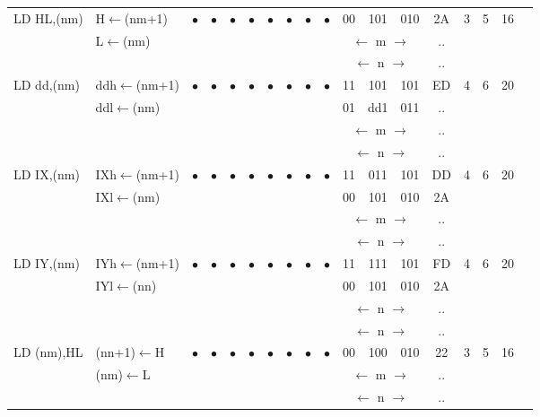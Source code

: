 \documentclass[oneside,a4paper]{book}
\begin{document}
{\begin{tabular}{llcccccccccccccccl}
		LD HL,(nm) & H$\leftarrow$(nm+1) &
			$\bullet$ & $\bullet$ & $\bullet$ & $\bullet$ & $\bullet$ & $\bullet$ & $\bullet$ & $\bullet$ & 
			00 & 101 & 010 & 
			2A & 3 & 
			5 & 16 & \\ 
		& L$\leftarrow$(nm) & \multicolumn{8}{c}{} & \multicolumn{3}{c}{$\longleftarrow$ m $\longrightarrow$} & .. & & & \\
		\multicolumn{10}{c}{} & \multicolumn{3}{c}{$\longleftarrow$ n $\longrightarrow$} & .. & & & \\[4pt]

		LD dd,(nm) & ddh$\leftarrow$(nm+1) &
			$\bullet$ & $\bullet$ & $\bullet$ & $\bullet$ & $\bullet$ & $\bullet$ & $\bullet$ & $\bullet$ & 
			11 & 101 & 101 & 
			ED & 4 & 
			6 & 20 & \\ 
		& ddl$\leftarrow$(nm) & \multicolumn{8}{c}{} & 01 & dd1 & 011 & .. & & & \\
		\multicolumn{10}{c}{} & \multicolumn{3}{c}{$\longleftarrow$ m $\longrightarrow$} & .. & & & \\
		\multicolumn{10}{c}{} & \multicolumn{3}{c}{$\longleftarrow$ n $\longrightarrow$} & .. & & & \\[4pt]

		LD IX,(nm) & IXh$\leftarrow$(nm+1) &
			$\bullet$ & $\bullet$ & $\bullet$ & $\bullet$ & $\bullet$ & $\bullet$ & $\bullet$ & $\bullet$ & 
			11 & 011 & 101 & 
			DD & 4 & 
			6 & 20 & \\ 
		& IXl$\leftarrow$(nm) & \multicolumn{8}{c}{} & 00 & 101 & 010 & 2A & & & \\
		\multicolumn{10}{c}{} & \multicolumn{3}{c}{$\longleftarrow$ m $\longrightarrow$} & .. & & & \\
		\multicolumn{10}{c}{} & \multicolumn{3}{c}{$\longleftarrow$ n $\longrightarrow$} & .. & & & \\[4pt]

		LD IY,(nm) & IYh$\leftarrow$(nm+1) &
			$\bullet$ & $\bullet$ & $\bullet$ & $\bullet$ & $\bullet$ & $\bullet$ & $\bullet$ & $\bullet$ & 
			11 & 111 & 101 & 
			FD & 4 & 
			6 & 20 & \\ 
		& IYl$\leftarrow$(nn) & \multicolumn{8}{c}{} & 00 & 101 & 010 & 2A & & & \\
		\multicolumn{10}{c}{} & \multicolumn{3}{c}{$\longleftarrow$ n $\longrightarrow$} & .. & & & \\
		\multicolumn{10}{c}{} & \multicolumn{3}{c}{$\longleftarrow$ n $\longrightarrow$} & .. & & & \\[4pt]

		LD (nm),HL & (nn+1)$\leftarrow$H &
			$\bullet$ & $\bullet$ & $\bullet$ & $\bullet$ & $\bullet$ & $\bullet$ & $\bullet$ & $\bullet$ & 
			00 & 100 & 010 & 
			22 & 3 & 
			5 & 16 & \\ 
		& (nm)$\leftarrow$L & \multicolumn{8}{c}{} & \multicolumn{3}{c}{$\longleftarrow$ m $\longrightarrow$} & .. & & & \\
		\multicolumn{10}{c}{} & \multicolumn{3}{c}{$\longleftarrow$ n $\longrightarrow$} & .. & & & \\[4pt]


\end{tabular}}
\end{document}
